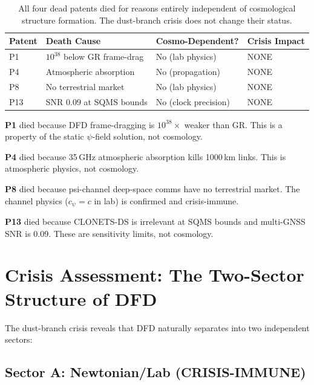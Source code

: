 \documentclass[11pt]{article}
\begin{document}
\begin{table}[h]
\centering
\begin{tabular}{llll}
\toprule
\textbf{Patent} & \textbf{Death Cause} & \textbf{Cosmo-Dependent?} & \textbf{Crisis Impact} \\
\midrule
P1 & $10^{38}$ below GR frame-drag & No (lab physics) & NONE \\
P4 & Atmospheric absorption & No (propagation) & NONE \\
P8 & No terrestrial market & No (lab physics) & NONE \\
P13 & SNR 0.09 at SQMS bounds & No (clock precision) & NONE \\
\bottomrule
\end{tabular}
\caption{All four dead patents died for reasons entirely independent of
cosmological structure formation. The dust-branch crisis does not change
their status.}
\end{table}

\textbf{P1} died because DFD frame-dragging is $10^{38}\times$ weaker than GR.
This is a property of the static $\psi$-field solution, not cosmology.

\textbf{P4} died because 35\,GHz atmospheric absorption kills 1000\,km links.
This is atmospheric physics, not cosmology.

\textbf{P8} died because psi-channel deep-space comms have no terrestrial
market. The channel physics ($c_\psi = c$ in lab) is confirmed and
crisis-immune.

\textbf{P13} died because CLONETS-DS is irrelevant at SQMS bounds and
multi-GNSS SNR is 0.09. These are sensitivity limits, not cosmology.

\section{Crisis Assessment: The Two-Sector Structure of DFD}

The dust-branch crisis reveals that DFD naturally separates into two
independent sectors:

\subsection{Sector A: Newtonian/Lab (CRISIS-IMMUNE)}
\end{document}
